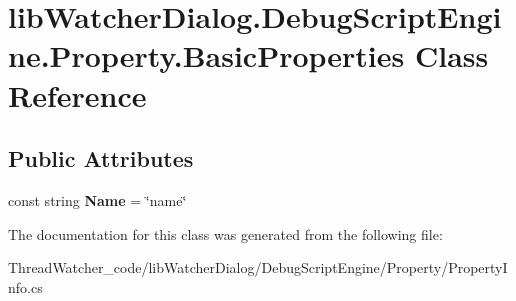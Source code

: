 \hypertarget{classlib_watcher_dialog_1_1_debug_script_engine_1_1_property_1_1_basic_properties}{\section{lib\+Watcher\+Dialog.\+Debug\+Script\+Engine.\+Property.\+Basic\+Properties Class Reference}
\label{classlib_watcher_dialog_1_1_debug_script_engine_1_1_property_1_1_basic_properties}
}
\subsection*{Public Attributes}
\begin{DoxyCompactItemize}
\item 
\hypertarget{classlib_watcher_dialog_1_1_debug_script_engine_1_1_property_1_1_basic_properties_a4d03ec56989ac17e3d50cc79efc23ac2}{const string {\bfseries Name} = \char`\"{}name\char`\"{}}\label{classlib_watcher_dialog_1_1_debug_script_engine_1_1_property_1_1_basic_properties_a4d03ec56989ac17e3d50cc79efc23ac2}

\end{DoxyCompactItemize}


The documentation for this class was generated from the following file\+:\begin{DoxyCompactItemize}
\item 
Thread\+Watcher\+\_\+code/lib\+Watcher\+Dialog/\+Debug\+Script\+Engine/\+Property/Property\+Info.\+cs\end{DoxyCompactItemize}
